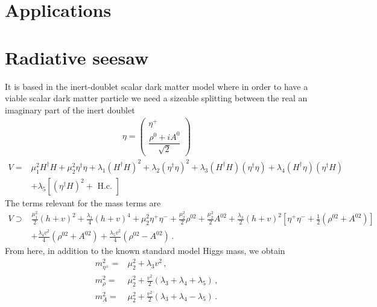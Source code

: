 \section{Applications}

\section{Radiative seesaw}
It is based in the inert-doublet scalar dark matter model where in order to have a viable scalar dark matter particle we need a sizeable splitting between the real an imaginary part of the inert doublet
\begin{align}
  \eta=\begin{pmatrix}
    \eta^+\\
    \dfrac{\rho^0+i A^0}{\sqrt{2}}
  \end{pmatrix}
\end{align}
\begin{align}
  V=& \mu_{1}^{2} H^{\dagger} H+\mu_{2}^{2} \eta^{\dagger} \eta+\lambda_{1}\left(H^{\dagger} H\right)^{2}+ \lambda_{2}\left(\eta^{\dagger} \eta\right)^{2} +\lambda_{3}\left(H^{\dagger} H\right)\left(\eta^{\dagger} \eta\right)+\lambda_{4}\left(H^{\dagger} \eta\right)\left(\eta^{\dagger} H\right) \nonumber\\
& + \lambda_{5}\left[\left(\eta^{\dagger} H\right)^{2}+\text { H.c. }\right]
\end{align}
The terms relevant for the mass terms are
\begin{align}
  V\supset& \frac{\mu_1^2}{2} \left( h+v\right)^2+\frac{\lambda_1}{4} \left( h+v \right)^4
  +\mu_2^2 \eta^+\eta^- +\frac{\mu_2^2}{2} \rho^{02} +\frac{\mu_2^2}{2} A^{02}
  +\frac{\lambda_3}{2} \left( h+v \right)^2 \left[ \eta^+\eta^- + \frac{1}{2}\left( \rho^{02}+A^{02} \right) \right] \nonumber\\
 &+ \frac{\lambda_4 v^2}{4} \left( \rho^{02}+A^{02} \right) + \frac{\lambda_5 v^2}{4} \left( \rho^{02}-A^{02} \right)\,.
\end{align}
From here, in addition to the known standard model Higgs mass, we obtain
\begin{align}
  m_{\eta^{\pm}}^2=&\mu_2^2+{\lambda_3 v^2}\,,  \nonumber\\ %
  m_{\rho}^2=&\mu_2^2+\frac{v^2}{2} \left(\lambda_3+\lambda_4+\lambda_5  \right)\,, \nonumber\\
  m_{A}^2=&\mu_2^2+\frac{v^2}{2} \left(\lambda_3+\lambda_4-\lambda_5  \right)\,. \nonumber\\
\end{align}

